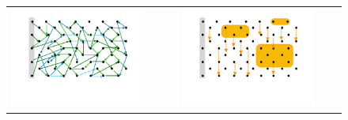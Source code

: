 \paragraph{}

 \begin{figure}[htb]
 \begin{tabular}{clclc}
\begin{minipage}{0.29\textwidth}
 \includegraphics[width=\linewidth, trim=100  120 130 60,clip]{diagrams/neccSuff_yellow_A.pdf}
\end{minipage}
 & \ \ \ & 
\begin{minipage}{0.29\textwidth}
 \includegraphics[width=\linewidth, trim=100  120 130 60,clip]{diagrams/neccSuff_yellow_B.pdf}

\end{minipage}
\end{tabular}
\end{figure}
